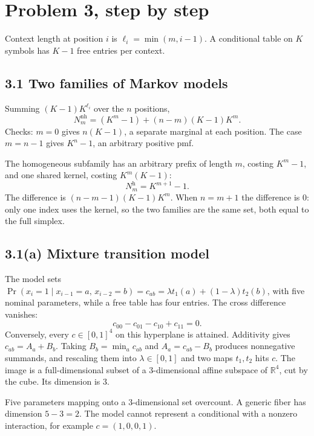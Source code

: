 \documentclass[11pt]{article}
\theoremstyle{remark}
\newcommand{\R}{\mathbb{R}}
\begin{document}
\newpage
\section{Problem 3, step by step}

Context length at position \(i\) is \(\ell_i=\min(m,i-1)\). A conditional table on \(K\) symbols has \(K-1\) free entries per context.

\subsection*{3.1 Two families of Markov models}

Summing \((K-1)K^{\ell_i}\) over the \(n\) positions,
\[
N_m^{\mathrm{nh}}=(K^m-1)+(n-m)(K-1)K^m.
\]
Checks: \(m=0\) gives \(n(K-1)\), a separate marginal at each position. The case \(m=n-1\) gives \(K^n-1\), an arbitrary positive pmf.

The homogeneous subfamily has an arbitrary prefix of length \(m\), costing \(K^m-1\), and one shared kernel, costing \(K^m(K-1)\):
\[
N_m^{\mathrm{h}}=K^{m+1}-1.
\]
The difference is \((n-m-1)(K-1)K^m\). When \(n=m+1\) the difference is \(0\): only one index uses the kernel, so the two families are the same set, both equal to the full simplex.

\subsection*{3.1(a) Mixture transition model}

The model sets \(\Pr(x_i=1\mid x_{i-1}=a,\,x_{i-2}=b)=c_{ab}=\lambda t_1(a)+(1-\lambda)t_2(b)\), with five nominal parameters, while a free table has four entries. The cross difference vanishes:
\[
c_{00}-c_{01}-c_{10}+c_{11}=0.
\]
Conversely, every \(c\in[0,1]^4\) on this hyperplane is attained. Additivity gives \(c_{ab}=A_a+B_b\). Taking \(B_b=\min_a c_{ab}\) and \(A_a=c_{ab}-B_b\) produces nonnegative summands, and rescaling them into \(\lambda\in[0,1]\) and two maps \(t_1,t_2\) hits \(c\). The image is a full-dimensional subset of a \(3\)-dimensional affine subspace of \(\R^4\), cut by the cube. Its dimension is \(3\).

Five parameters mapping onto a \(3\)-dimensional set overcount. A generic fiber has dimension \(5-3=2\). The model cannot represent a conditional with a nonzero interaction, for example \(c=(1,0,0,1)\).
\end{document}
